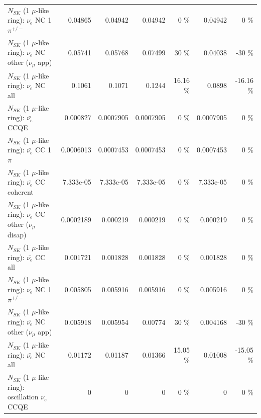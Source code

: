 \begin{table}
\begin{tabular}{| l | r | r | r  r | r  r |}
\hline
                           $N_{SK}$ (1 $\mu$-like ring): $\nu_e$ NC 1$\pi^{+/-}$ &         0.04865 &         0.04942 &         0.04942 &        0 \%  &         0.04942 &        0 \%  \\ 
                  $N_{SK}$ (1 $\mu$-like ring): $\nu_e$ NC other ($\nu_\mu$ app) &         0.05741 &         0.05768 &         0.07499 &       30 \%  &         0.04038 &      -30 \%  \\ 
                                  $N_{SK}$ (1 $\mu$-like ring): $\nu_{e}$ NC all &          0.1061 &          0.1071 &          0.1244 &    16.16 \%  &          0.0898 &   -16.16 \%  \\ 
\hline
\hline
\hline
                                $N_{SK}$ (1 $\mu$-like ring): $\bar{\nu_e}$ CCQE &        0.000827 &       0.0007905 &       0.0007905 &        0 \%  &       0.0007905 &        0 \%  \\ 
                           $N_{SK}$ (1 $\mu$-like ring): $\bar{\nu_e}$ CC 1$\pi$ &       0.0006013 &       0.0007453 &       0.0007453 &        0 \%  &       0.0007453 &        0 \%  \\ 
                         $N_{SK}$ (1 $\mu$-like ring): $\bar{\nu_e}$ CC coherent &       7.333e-05 &       7.333e-05 &       7.333e-05 &        0 \%  &       7.333e-05 &        0 \%  \\ 
          $N_{SK}$ (1 $\mu$-like ring): $\bar{\nu_e}$ CC other ($\nu_\mu$ disap) &       0.0002189 &        0.000219 &        0.000219 &        0 \%  &        0.000219 &        0 \%  \\ 
                            $N_{SK}$ (1 $\mu$-like ring): $\bar{\nu_{e}}$ CC all &        0.001721 &        0.001828 &        0.001828 &        0 \%  &        0.001828 &        0 \%  \\ 
\hline
                     $N_{SK}$ (1 $\mu$-like ring): $\bar{\nu_e}$ NC 1$\pi^{+/-}$ &        0.005805 &        0.005916 &        0.005916 &        0 \%  &        0.005916 &        0 \%  \\ 
            $N_{SK}$ (1 $\mu$-like ring): $\bar{\nu_e}$ NC other ($\nu_\mu$ app) &        0.005918 &        0.005954 &         0.00774 &       30 \%  &        0.004168 &      -30 \%  \\ 
                            $N_{SK}$ (1 $\mu$-like ring): $\bar{\nu_{e}}$ NC all &         0.01172 &         0.01187 &         0.01366 &    15.05 \%  &         0.01008 &   -15.05 \%  \\ 
\hline
\hline
\hline
                          $N_{SK}$ (1 $\mu$-like ring): oscillation $\nu_e$ CCQE &               0 &               0 &               0 &        0 \%  &               0 &        0 \%  \\ 

\end{tabular}
\end{table}
